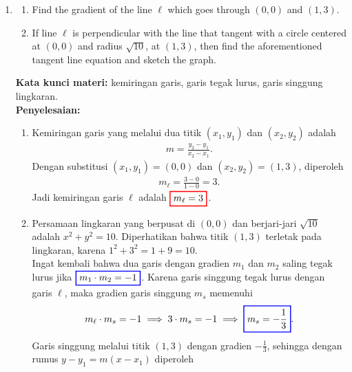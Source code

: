 \documentclass[10pt,openany,a4paper]{article}
\theoremstyle{definition}
\theoremstyle{definition}
\theoremstyle{plain}
\newenvironment{jawab}[2][tes]{%
\par\noindent\textbf{Kata kunci materi:} #1.\\
\textbf{Penyelesaian:} #2%
}{}
\begin{document}
\begin{enumerate}
    \item \begin{enumerate}
        \item Find the gradient of the line $\ell$ which goes through $(0,0)$ and $(1,3)$.
        \item If line $\ell$ is perpendicular with the line that tangent with a circle centered at $(0,0)$ and radius $\sqrt{10}$, at $(1,3)$, then find the aforementioned tangent line equation and sketch the graph.
    \end{enumerate}
    \begin{jawab}[kemiringan garis, garis tegak lurus, garis singgung lingkaran]{
        \begin{enumerate}
            \item Kemiringan garis yang melalui dua titik $(x_1,y_1)$ dan $(x_2,y_2)$ adalah
            \begin{align*}
                m = \frac{y_2 - y_1}{x_2 - x_1}.
            \end{align*}
            Dengan substitusi $(x_1,y_1)=(0,0)$ dan $(x_2,y_2)=(1,3)$, diperoleh
            \begin{align*}
                m_\ell = \frac{3 - 0}{1 - 0} = 3.
            \end{align*}
            Jadi kemiringan garis $\ell$ adalah $\colorlet{oldcolor}{.}
        \color{red}
        \setlength{\fboxrule}{1pt} \boxed{\color{oldcolor}m_\ell = 3}\color{oldcolor}$.
            \item Persamaan lingkaran yang berpusat di $(0,0)$ dan berjari-jari $\sqrt{10}$ adalah $x^2 + y^2 = 10$. Diperhatikan bahwa titik $(1,3)$ terletak pada lingkaran, karena $1^2 + 3^2 = 1 + 9 = 10$. \\
            Ingat kembali bahwa dua garis dengan gradien $m_1$ dan $m_2$ saling tegak lurus jika $\colorlet{oldcolor}{.}
        \color{blue}
        \setlength{\fboxrule}{1pt} \boxed{\color{oldcolor}m_1\cdot m_2=-1}\color{oldcolor}$. Karena garis singgung tegak lurus dengan garis $\ell$, maka gradien garis singgung $m_s$ memenuhi
            \begin{align*}
                m_\ell \cdot m_s = -1 \implies 3\cdot m_s = -1 \implies \colorlet{oldcolor}{.}
        \color{blue}
        \setlength{\fboxrule}{1pt} \boxed{\color{oldcolor}m_s = -\frac{1}{3}}\color{oldcolor}.
            \end{align*}
            Garis singgung melalui titik $(1,3)$ dengan gradien $-\frac{1}{3}$, sehingga dengan rumus $y - y_1 = m(x - x_1)$ diperoleh

\end{enumerate}}
\end{jawab}
\end{enumerate}
\end{document}
